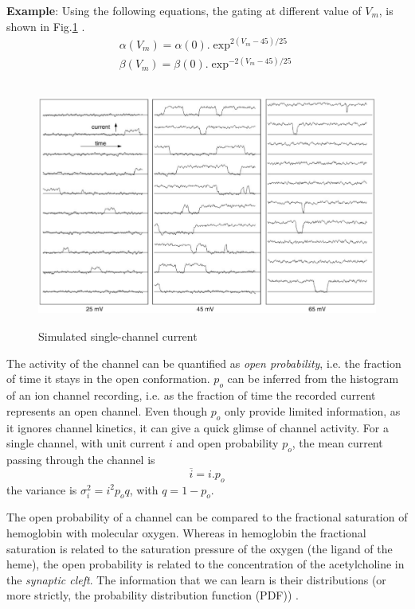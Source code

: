 {\bf Example}: Using the following equations, the gating at different value of
$V_m$, is shown in Fig.\ref{fig:single_channel_current_Alvarez2002} \citep{alvarez2002}.
\begin{equation}
\begin{split}
\alpha(V_m) = \alpha(0).\exp^{2(V_m-45)/25} \\
\beta(V_m) = \beta(0).\exp^{-2(V_m-45)/25}
\end{split}
\end{equation}


\begin{figure}[!hbt]
 \centerline{\includegraphics[height=8cm,angle=0]{./images/single_channel_current_Alvarez2002.eps}}
 \caption{Simulated single-channel current}
\label{fig:single_channel_current_Alvarez2002}
\end{figure}

The activity of the channel can be quantified as {\it open probability}, i.e.
the fraction of time it stays in the open conformation. $p_o$ can be inferred
from the histogram of an ion channel recording, i.e. as the fraction of time the
recorded current represents an open channel. Even though $p_o$ only provide
limited information, as it ignores channel kinetics, it can give a quick glimse
of channel activity. For a single channel, with unit current $i$ and open
probability $p_o$, the mean current passing through the channel is
\begin{equation}
  \label{eq:828}
  \overline{i} = i.p_o
\end{equation}
the variance is $\sigma_i^2=i^2p_oq$, with $q=1-p_o$.

\begin{framed}
The open probability of
a channel can be compared to the fractional saturation of hemoglobin with
molecular oxygen. Whereas in hemoglobin the fractional saturation is related to
the saturation pressure of the oxygen (the ligand of the heme), the open
probability is related to the concentration of the acetylcholine in the {\it
synaptic cleft}. The information that we can learn is their distributions (or
more strictly, the probability distribution function (PDF))
\citep{colquhoun1994}.
\end{framed}

